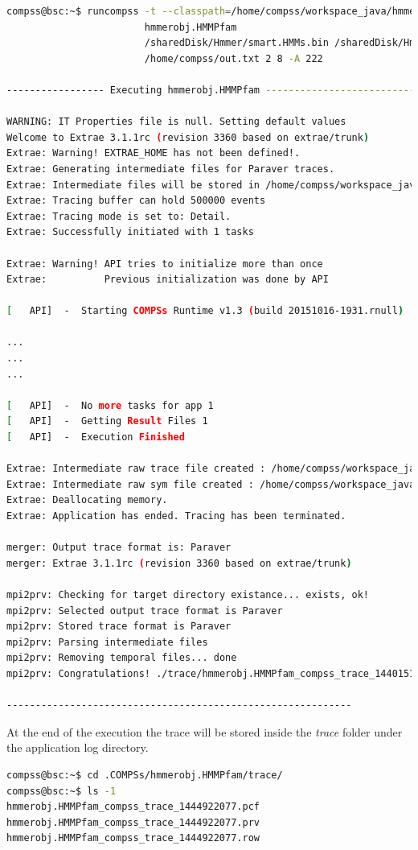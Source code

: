 \begin{lstlisting}[language=bash]
compss@bsc:~$ runcompss -t --classpath=/home/compss/workspace_java/hmmerobj/jar/hmmerobj.jar 
                        hmmerobj.HMMPfam 
                        /sharedDisk/Hmmer/smart.HMMs.bin /sharedDisk/Hmmer/256seq 
                        /home/compss/out.txt 2 8 -A 222

----------------- Executing hmmerobj.HMMPfam --------------------------

WARNING: IT Properties file is null. Setting default values
Welcome to Extrae 3.1.1rc (revision 3360 based on extrae/trunk)
Extrae: Warning! EXTRAE_HOME has not been defined!.
Extrae: Generating intermediate files for Paraver traces.
Extrae: Intermediate files will be stored in /home/compss/workspace_java/hmmerobj/jar
Extrae: Tracing buffer can hold 500000 events
Extrae: Tracing mode is set to: Detail.
Extrae: Successfully initiated with 1 tasks

Extrae: Warning! API tries to initialize more than once
Extrae:          Previous initialization was done by API

[   API]  -  Starting COMPSs Runtime v1.3 (build 20151016-1931.rnull)

...
...
...

[   API]  -  No more tasks for app 1
[   API]  -  Getting Result Files 1
[   API]  -  Execution Finished

Extrae: Intermediate raw trace file created : /home/compss/workspace_java/hmmerobj/jar/set-0/TRACE@bsc.0000031637000000000000.mpit
Extrae: Intermediate raw sym file created : /home/compss/workspace_java/hmmerobj/jar/set-0/TRACE@bsc.0000031637000000000000.sym
Extrae: Deallocating memory.
Extrae: Application has ended. Tracing has been terminated.

merger: Output trace format is: Paraver
merger: Extrae 3.1.1rc (revision 3360 based on extrae/trunk)

mpi2prv: Checking for target directory existance... exists, ok!
mpi2prv: Selected output trace format is Paraver
mpi2prv: Stored trace format is Paraver
mpi2prv: Parsing intermediate files
mpi2prv: Removing temporal files... done
mpi2prv: Congratulations! ./trace/hmmerobj.HMMPfam_compss_trace_1440151114.prv has been generated.

------------------------------------------------------------
\end{lstlisting}

At the end of the execution the trace will be stored inside the \textit{trace} folder under the application log directory.
\begin{lstlisting}[language=bash]
compss@bsc:~$ cd .COMPSs/hmmerobj.HMMPfam/trace/
compss@bsc:~$ ls -1
hmmerobj.HMMPfam_compss_trace_1444922077.pcf
hmmerobj.HMMPfam_compss_trace_1444922077.prv
hmmerobj.HMMPfam_compss_trace_1444922077.row
\end{lstlisting}


